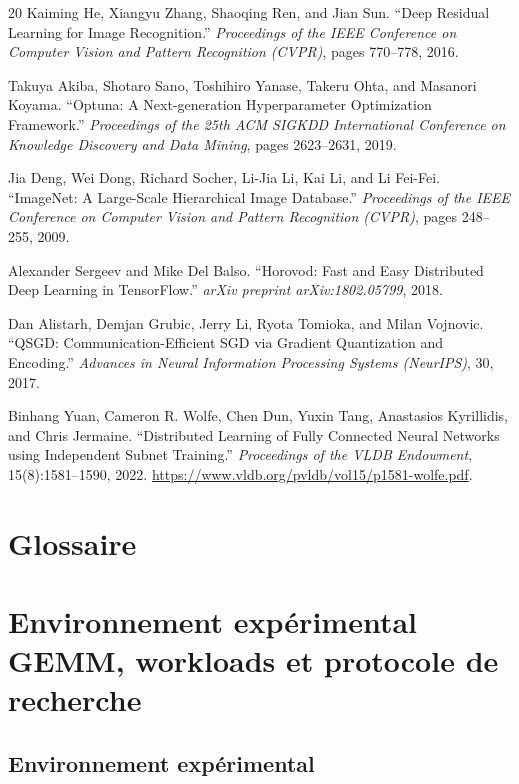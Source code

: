 \documentclass[a4paper,11pt,oneside]{article}
\begin{document}
\begin{thebibliography}{20}
Kaiming He, Xiangyu Zhang, Shaoqing Ren, and Jian Sun.
``Deep Residual Learning for Image Recognition.''
\textit{Proceedings of the IEEE Conference on Computer Vision and Pattern Recognition (CVPR)}, pages 770--778, 2016.

Takuya Akiba, Shotaro Sano, Toshihiro Yanase, Takeru Ohta, and Masanori Koyama.
``Optuna: A Next-generation Hyperparameter Optimization Framework.''
\textit{Proceedings of the 25th ACM SIGKDD International Conference on Knowledge Discovery and Data Mining}, pages 2623--2631, 2019.

Jia Deng, Wei Dong, Richard Socher, Li-Jia Li, Kai Li, and Li Fei-Fei.
``ImageNet: A Large-Scale Hierarchical Image Database.''
\textit{Proceedings of the IEEE Conference on Computer Vision and Pattern Recognition (CVPR)}, pages 248--255, 2009.

Alexander Sergeev and Mike Del Balso.
``Horovod: Fast and Easy Distributed Deep Learning in TensorFlow.''
\textit{arXiv preprint arXiv:1802.05799}, 2018.

Dan Alistarh, Demjan Grubic, Jerry Li, Ryota Tomioka, and Milan Vojnovic.
``QSGD: Communication-Efficient SGD via Gradient Quantization and Encoding.''
\textit{Advances in Neural Information Processing Systems (NeurIPS)}, 30, 2017.

Binhang Yuan, Cameron R. Wolfe, Chen Dun, Yuxin Tang, Anastasios Kyrillidis, and Chris Jermaine.
``Distributed Learning of Fully Connected Neural Networks using Independent Subnet Training.''
\textit{Proceedings of the VLDB Endowment}, 15(8):1581--1590, 2022.
\url{https://www.vldb.org/pvldb/vol15/p1581-wolfe.pdf}.

\end{thebibliography}

\section*{Glossaire}

\appendix

\section{Environnement expérimental GEMM, workloads et protocole de recherche}\label{app:gemm_setup}

\subsection{Environnement expérimental}
\end{document}
